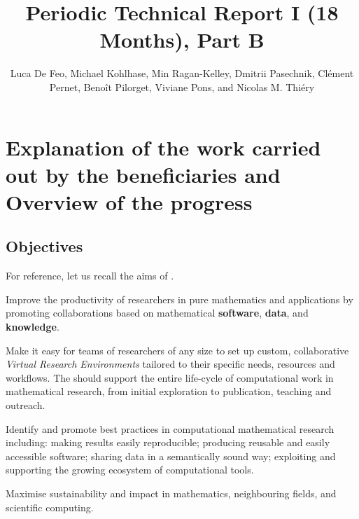 \documentclass{deliverablereport}
\title{Periodic Technical Report I (18 Months), Part B}
\author{Luca De Feo, Michael Kohlhase, Min Ragan-Kelley, Dmitrii Pasechnik, Clément
  Pernet, Benoît Pilorget, Viviane Pons, and Nicolas M. Thiéry}
\begin{document}
\oldmaketitle
\tableofcontents\newpage

\section{Explanation of the work carried out by the beneficiaries and Overview of the progress}


\subsection{Objectives}

For reference, let us recall the aims of \ODK.
\begin{compactenum}
\item \label{aim:collaboration} Improve the productivity of
  researchers in pure mathematics and applications by promoting
  collaborations based on mathematical \textbf{software},
  \textbf{data}, and \textbf{knowledge}.
\item \label{aim:vre} Make it easy for teams of researchers of any
  size to set up custom, collaborative \emph{Virtual Research
    Environments} tailored to their specific needs, resources and
  workflows. The \VREs should support the entire life-cycle of
  computational work in mathematical research, from initial
  exploration to publication, teaching and outreach.
\item \label{aim:sharing} Identify and promote best practices in
  computational mathematical research including: making results easily
  reproducible; producing reusable and easily accessible
  software; sharing data in a semantically sound way; exploiting and
  supporting the growing ecosystem of computational tools.
\item \label{aim:impact} Maximise sustainability and impact in
  mathematics, neighbouring fields, and scientific computing.
\end{compactenum}
\end{document}

